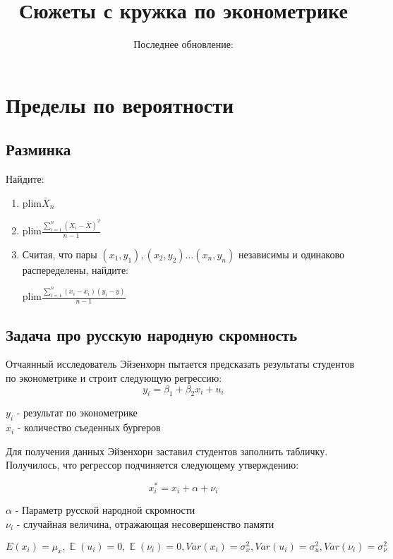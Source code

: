 \documentclass[10pt, a4paper]{extarticle}
\title{Сюжеты с кружка по эконометрике}
\author{Последнее обновление:}
\DeclareMathOperator{\E}{\mathbb{E}}
\begin{document}
	
\maketitle

\tableofcontents

\section{Пределы по вероятности}
\subsection{Разминка}
Найдите:
\begin{enumerate}
	\item $\text{plim} \bar{X}_n$
	
	\item $\text{plim} \frac{\sum_{i = 1}^{n}(X_i - \bar{X})^2}{n - 1}$
	
	\item Считая, что пары $(x_1, y_1), (x_2, y_2) \dots (x_n, y_n)$ независимы и одинаково распеределены, найдите:
	
	$ \text{plim} \frac{\sum_{i = 1}^n(x_i - \bar{x_i})(y_i - \bar{y})}{n - 1}$
	
	
\end{enumerate}





\subsection{Задача про русскую народную скромность}

Отчаянный исследователь Эйзенхорн пытается предсказать результаты студентов по эконометрике и строит следующую регрессию:
\[
y_i = \beta_1 + \beta_2x_i + u_i
\]


$y_i$ - результат по эконометрике\\
$x_i$ - количество съеденных бургеров

Для получения данных Эйзенхорн заставил студентов заполнить табличку. Получилось, что регрессор подчиняется следующему утверждению:

\[
x_i^* = x_i + \alpha + \nu_i
\]

$\alpha$ - Параметр русской народной скромности\\
$\nu_i$ - случайная величина, отражающая несовершенство памяти

$E(x_i) = \mu_x, \E(u_i) = 0, \E(\nu_i) = 0, Var(x_i) = \sigma_x^2, Var(u_i) = \sigma_u^2, Var(\nu_i) = \sigma_\nu^2$\\
\end{document}
